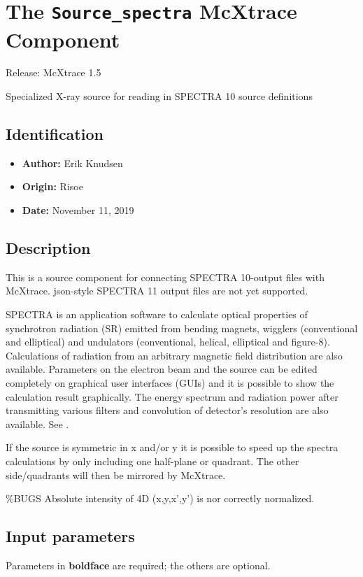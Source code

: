 \section{The \texttt{Source\_spectra} McXtrace Component}
Release: McXtrace 1.5

Specialized X-ray source for reading in SPECTRA 10 source definitions

\subsection*{Identification}
\begin{itemize}
  \item \textbf{Author:} Erik Knudsen
  \item \textbf{Origin:} Risoe
  \item \textbf{Date:} November 11, 2019
\end{itemize}

\subsection*{Description}
This is a source component for connecting SPECTRA 10-output files with McXtrace. json-style SPECTRA 11 output files are not yet supported.

SPECTRA is an application software to calculate optical properties of synchrotron radiation (SR) emitted from bending magnets, wigglers (conventional and elliptical) and undulators (conventional, helical, elliptical and figure-8). Calculations of radiation from an arbitrary magnetic field distribution are also available. Parameters on the electron beam and the source can be edited completely on graphical user interfaces (GUIs) and it is possible to show the calculation result graphically. The energy spectrum and radiation power after transmitting various filters and convolution of detector's resolution are also available. See .

If the source is symmetric in x and/or y it is possible to speed up the spectra calculations by only including one half-plane or quadrant. The other side/quadrants will then be mirrored by McXtrace.

\%BUGS Absolute intensity of 4D (x,y,x',y') is nor correctly normalized.

\subsection*{Input parameters}
Parameters in \textbf{boldface} are required; the others are optional.

